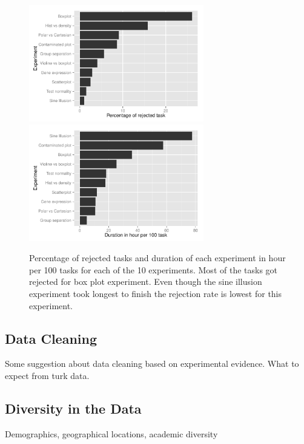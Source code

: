 \documentclass[11pt]{article}
\begin{document}
\begin{figure}[htbp] 
   \centering
   \includegraphics[width=3in]{rejected_task.pdf}
      \includegraphics[width=3in]{task_duration.pdf} 
   \caption{Percentage of rejected tasks and duration of each experiment in hour per 100 tasks for each of the 10 experiments. Most of the tasks got rejected for box plot experiment.  Even though the sine illusion experiment took longest to finish the rejection rate is lowest for this experiment.}
   \label{fig:task_duration}
\end{figure}


\subsection{Data Cleaning} Some suggestion about data cleaning based on experimental evidence. What to expect from turk data.

\subsection{Diversity in the Data} Demographics, geographical locations, academic diversity

\end{document}
